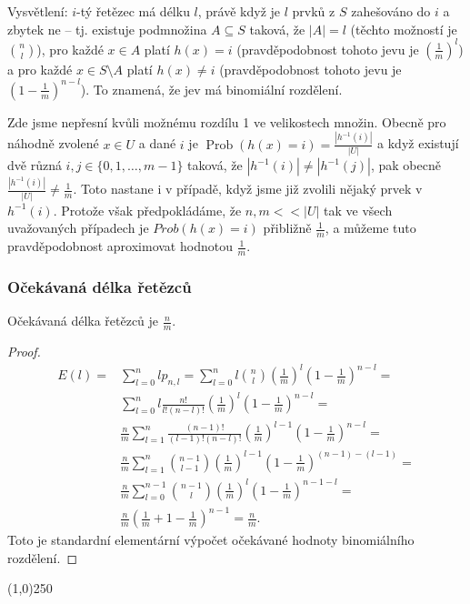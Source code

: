\documentclass[a4paper,12pt]{article}
\newenvironment{myproof}{
  \begin{proof}
    
  }{
  \end{proof}
  \begin{center}
   \line(1,0){250}
   \end{center}
  }
\DeclareMathOperator*{\Prob}{Prob}
\begin{document}
Vysvětlení: $i$-tý řetězec má délku $
l$, právě když je $l$ prvků z $S$ zahešováno do $i$ a zbytek ne -- tj. existuje 
pod\-mno\-žina $A\subseteq S$ taková, že $|A|=l$ (těchto možností je 
$\binom nl$), pro každé $x\in A$ platí $h(x)=i$ (pravděpodobnost 
tohoto jevu je $(\frac 1m)^l$) a pro každé $x\in S\setminus 
A$ platí $h(x)\ne i$ 
(pravděpodobnost tohoto jevu je $(1-\frac 1m)^{n-l}$). To znamená, že jev má 
binomiální rozdělení.

Zde jsme nepřesní kvůli možnému rozdílu 1 ve velikostech množin. Obecně pro náhodně zvolené $
x\in U$ 
a dané $i$ je $\Prob(h(x)=i)=\frac {|h^{-1}(i)|}{|U|}$ a když existují dvě různá 
$i,j\in \{0,1,\dots,m-1\}$ taková, že $|h^{-1}(i)|\ne |h^{-1}
(j)|$, pak obecně 
$\frac {|h^{-1}(i)|}{|U|}\ne\frac 1m$. Toto nastane i v případě, když jsme již zvolili nějaký 
prvek v $h^{-1}(i)$. Protože však předpokládáme, že $
n,m<<|U|$ tak 
ve všech uvažovaných případech je $Prob(h(x)=i)$ přibližně 
$\frac 1m$, a můžeme tuto pravděpodobnost aproximovat 
hodnotou $\frac 1m$.

\subsubsection{Očekávaná délka řetězců}

\begin{veta}
    Očekávaná délka řetězců je $\frac{n}{m}$.
\end{veta}

\begin{myproof}

\begin{align*} E(l)=&\sum_{l=0}^nlp_{n,l}=\sum_{l=0}^nl\binom nl(\frac 
1m)^l(1-\frac 1m)^{n-l}=\\
&\sum_{l=0}^nl\frac {n!}{l!(n-l)!}(\frac 1m)^l(1-\frac 1m)^{n-l}=\\
&\frac nm\sum_{l=1}^n\frac {(n-1)!}{(l-1)!(n-l)!}(\frac 1m)^{l-1}
(1-\frac 1m)^{n-l}=\\
&\frac nm\sum_{l=1}^n\binom {n-1}{l-1}(\frac 1m)^{l-1}(1-\frac 1m
)^{(n-1)-(l-1)}=\\
&\frac nm\sum_{l=0}^{n-1}\binom {n-1}l(\frac 1m)^l(1-\frac 1m)^{n
-1-l}=\\
&\frac nm(\frac 1m+1-\frac 1m)^{n-1}=\frac nm.\end{align*}
Toto je standardní elementární výpočet 
očekávané hodnoty binomiálního rozdělení.  
\end{myproof}
\end{document}
